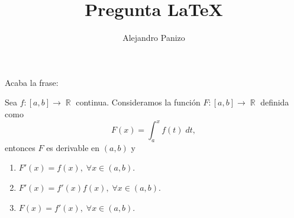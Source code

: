 \documentclass[10pt,spanish,hyperref={pdfpagelabels=false}]{beamer}
\author{Alejandro Panizo}
\title{Pregunta \LaTeX}
\DeclareMathOperator{\RR}{\mathbb{R}}
\DeclareMathOperator{\too}{\longrightarrow }
\begin{document}
\Large

\rightskip=0pt

\begin{frame}

Acaba la frase:

Sea $f:[a,b]\too \RR$ continua. Consideramos la funci\'{o}n $F:[a,b]\to \RR $ definida como
$$ F(x)=\int _a^xf(t)\; dt,$$ entonces $F$ es derivable en $(a,b)$ y

\begin{enumerate}[1.] \rightskip=0pt
\item $F'(x)=f(x), \; \forall x\in (a,b)$.
\item $F'(x)=f'(x) f(x), \; \forall x\in (a,b)$.
\item $F(x)=f'(x), \; \forall x\in (a,b)$.
\end{enumerate}


\end{frame}
\end{document}
